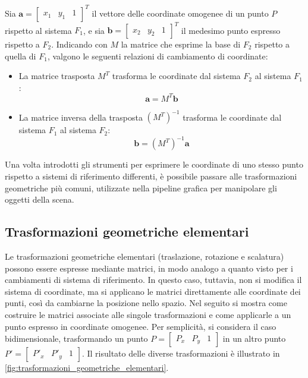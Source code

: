 \begin{proposizione}
    \label{prop:cambio_sdr}
    Sia $\mathbf{a} = \begin{bmatrix} x_1 & y_1 & 1 \end{bmatrix}^T$ il vettore delle coordinate omogenee di un punto $P$ rispetto al sistema $F_1$, e sia $\mathbf{b} = \begin{bmatrix} x_2 & y_2 & 1 \end{bmatrix}^T$ il medesimo punto espresso rispetto a $F_2$.
    Indicando con $M$ la matrice che esprime la base di $F_2$ rispetto a quella di $F_1$, valgono le seguenti relazioni di cambiamento di coordinate:
    \begin{itemize}
        \item La matrice trasposta $M^T$ trasforma le coordinate dal sistema $F_2$ al sistema $F_1$:
        \[
            \mathbf{a} = M^T \mathbf{b}
        \]
        \item La matrice inversa della trasposta $(M^T)^{-1}$ trasforma le coordinate dal sistema $F_1$ al sistema $F_2$:
        \[
            \mathbf{b} = (M^T)^{-1} \mathbf{a}
        \]
    \end{itemize}
\end{proposizione}

Una volta introdotti gli strumenti per esprimere le coordinate di uno stesso punto rispetto a sistemi di riferimento differenti, è possibile passare alle trasformazioni geometriche più comuni, utilizzate nella pipeline grafica per manipolare gli oggetti della scena.

\subsection{Trasformazioni geometriche elementari}
Le trasformazioni geometriche elementari (traslazione, rotazione e scalatura) possono essere espresse mediante matrici, in modo analogo a quanto visto per i cambiamenti di sistema di riferimento.
In questo caso, tuttavia, non si modifica il sistema di coordinate, ma si applicano le matrici direttamente alle coordinate dei punti, così da cambiarne la posizione nello spazio.
Nel seguito si mostra come costruire le matrici associate alle singole trasformazioni e come applicarle a un punto espresso in coordinate omogenee.
Per semplicità, si considera il caso bidimensionale, trasformando un punto $P = \begin{bmatrix} P_x & P_y & 1 \end{bmatrix}$ in un altro punto $P' = \begin{bmatrix} {P'}_x & {P'}_y & 1 \end{bmatrix}$.
Il risultato delle diverse trasformazioni è illustrato in \cref{fig:trasformazioni_geometriche_elementari}.

